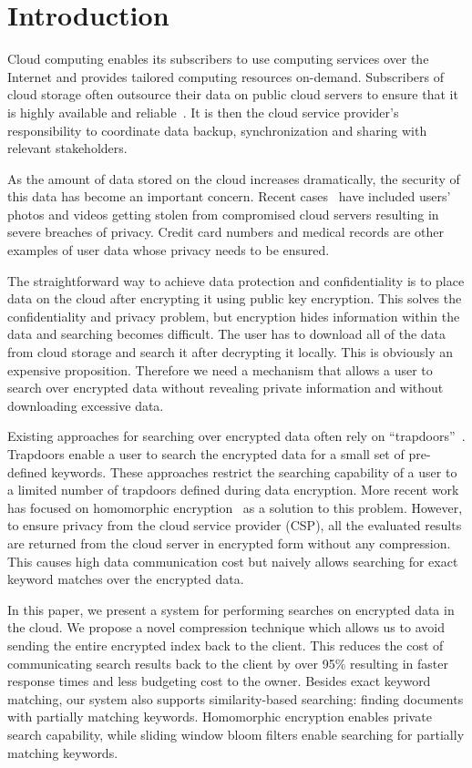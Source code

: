 \section{Introduction}

Cloud computing enables its subscribers to use computing services over the 
Internet and provides tailored computing resources on-demand. 
Subscribers of cloud storage often outsource their data on public cloud servers
to ensure that it is highly available and reliable~\cite{wang2012toward}. 
It is then the cloud service provider's
responsibility to coordinate data backup, synchronization and sharing
with relevant stakeholders. 

As the amount of data stored on the cloud increases dramatically, the security 
of this data has become an important concern. Recent cases~\cite{top_threats}
have included users' photos and videos getting stolen from compromised cloud servers resulting in
severe breaches of privacy. Credit card numbers and medical
records are other examples of user data whose privacy needs to be ensured.

The straightforward way to achieve data protection and confidentiality is to
place data on the cloud after encrypting it using public key encryption.
This solves the confidentiality and privacy problem,
but encryption hides information within the data and searching becomes 
difficult. The user
has to download all of the data from cloud storage and search it after 
decrypting it locally. 
This is
obviously an expensive proposition. Therefore we need a mechanism 
that allows a user to search over encrypted data without revealing 
private information and without downloading excessive data.

Existing approaches for searching over encrypted data often rely on
``trapdoors''~\cite{song,goh2003secure,boneh}. 
Trapdoors enable a user to search the encrypted data for a small 
set of pre-defined keywords. These approaches restrict the searching
capability of a user to a limited number of trapdoors defined during data 
encryption. More recent work has focused on homomorphic encryption~\cite{craig,zeehan} as a solution
to this problem. However, to ensure privacy from the cloud service provider (CSP), 
all the evaluated results
are returned from the cloud server in encrypted form without any compression. This causes high data
communication cost but naively allows searching for exact keyword matches over the encrypted data.

In this paper, we present a system for performing searches on encrypted 
data in the cloud. We propose a novel compression technique which allows us to
avoid sending the entire encrypted index back to the client. This reduces
the cost of communicating search results back to the client by over 95\% resulting in 
faster response times and less budgeting cost to the owner. 
Besides exact keyword matching, our system also
supports similarity-based searching: finding documents with partially matching 
keywords. Homomorphic encryption enables private search capability, 
while sliding window 
bloom filters enable searching for partially matching keywords. 

